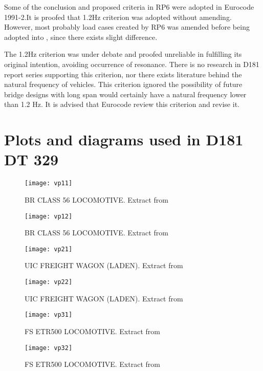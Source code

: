 \begin{appendices}
Some of the conclusion and proposed criteria in RP6 were adopted in Eurocode 1991-2.It is proofed that 1.2Hz criterion was adopted without amending. However, most probably load cases created by RP6 was amended before being adopted into \cite[A6.5.2]{EC12}, since there exists slight difference. 

The 1.2Hz criterion was under debate and proofed unreliable in fulfilling its original intention, avoiding occurrence of resonance. There is no research in D181 report series supporting this criterion, nor there exists literature behind the natural frequency of vehicles. This criterion ignored the possibility of future bridge designs with long span would certainly have a natural frequency lower than 1.2 Hz. It is advised that Eurocode review this criterion and revise it.


\chapter{Plots and diagrams used in D181 DT 329}\label{app:dt329data}

\begin{figure}[h]
    \centering
    \texttt{[image: vp11]}
    \caption{BR CLASS 56 LOCOMOTIVE. Extract from \cite[Appendix 2]{d181dt329}}
\end{figure}

\begin{figure}[h]
    \centering
    \texttt{[image: vp12]}
    \caption{BR CLASS 56 LOCOMOTIVE. Extract from \cite[Appendix 2]{d181dt329}}
\end{figure}

\begin{figure}[h]
    \centering
    \texttt{[image: vp21]}
    \caption{UIC FREIGHT WAGON (LADEN). Extract from \cite[Appendix 2]{d181dt329}}
\end{figure}

\begin{figure}[h]
    \centering
    \texttt{[image: vp22]}
    \caption{UIC FREIGHT WAGON (LADEN). Extract from \cite[Appendix 2]{d181dt329}}
\end{figure}

\begin{figure}[h]
    \centering
    \texttt{[image: vp31]}
    \caption{FS ETR500 LOCOMOTIVE. Extract from \cite[Appendix 2]{d181dt329}}
\end{figure}

\begin{figure}[h]
    \centering
    \texttt{[image: vp32]}
    \caption{FS ETR500 LOCOMOTIVE. Extract from \cite[Appendix 2]{d181dt329}}
\end{figure}


\end{appendices}
